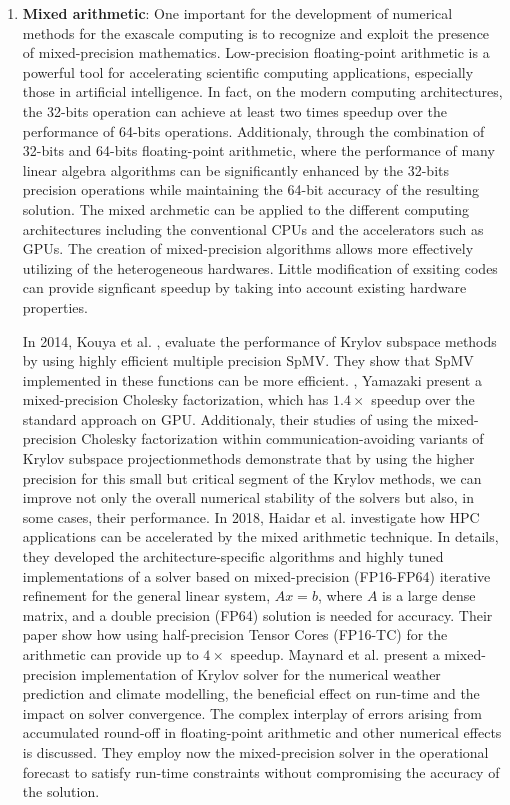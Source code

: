 \begin{enumerate}
	\item \textbf{Mixed arithmetic}: One important for the development of numerical methods for the exascale computing is to recognize and exploit the presence of mixed-precision mathematics. Low-precision floating-point arithmetic is a powerful tool for accelerating scientific computing applications, especially those in artificial intelligence. In fact, on the modern computing architectures, the 32-bits operation can achieve at least two times speedup over the performance of 64-bits operations. Additionaly, through the combination of 32-bits and 64-bits floating-point arithmetic, where the performance of many linear algebra algorithms can be significantly enhanced by the 32-bits precision operations while maintaining the 64-bit accuracy of the resulting solution. The mixed archmetic can be applied to the different computing architectures including the conventional CPUs and the accelerators such as GPUs. The creation of mixed-precision algorithms allows more effectively utilizing of the heterogeneous hardwares. Little modification of exsiting codes can provide signficant speedup by taking into account existing hardware properties. 
	
	In 2014, Kouya et al. \cite{kouya2014highly}, evaluate the performance of Krylov subspace methods by using highly efficient multiple precision SpMV. They show that SpMV implemented in these functions can be more efficient. \cite{yamazaki2015mixed}, Yamazaki present a mixed-precision Cholesky factorization, which has $1.4\times$ speedup over the standard approach on GPU. Additionaly, their studies of  using the mixed-precision Cholesky factorization within communication-avoiding variants of Krylov subspace projectionmethods demonstrate that by using the higher precision for this small but critical segment of the Krylov methods, we can improve not only the overall numerical stability of the solvers but also, in some cases, their performance. In 2018, Haidar et al. \cite{haidar2018harnessing} investigate how HPC applications can be accelerated by the mixed arithmetic technique. In details, they developed the architecture-specific algorithms and highly tuned implementations of a solver based on mixed-precision (FP16-FP64) iterative refinement for the general linear system, $Ax=b$, where $A$ is a large dense matrix, and a double precision (FP64) solution is needed for accuracy. Their paper show how using half-precision Tensor Cores (FP16-TC) for the arithmetic can provide up to $4\times$ speedup. Maynard et al.  \cite{maynard2018precision} present a mixed-precision implementation of Krylov solver for the numerical weather prediction and climate modelling, the beneficial effect on run-time and the impact on solver convergence. The complex interplay of errors arising from accumulated round-off in floating-point arithmetic and other numerical effects is discussed. They employ now the mixed-precision solver in the operational forecast to satisfy run-time constraints without compromising the accuracy of the solution.
	

\end{enumerate}
